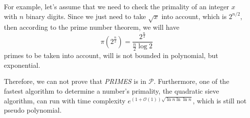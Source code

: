 \documentclass[12pt, a4paper]{article}
\begin{document}
For example, let's assume that we need to check the primality of an integer $x$ with $n$ binary digits. 
Since we just need to take $\sqrt{x}$ into account, which is $2^{n/2}$, then according to the prime number theorem, we will have
$$\pi(2^{\frac{n}{2}}) = \frac{2^{\frac{n}{2}}}{\frac{n}{2} \log 2}$$
primes to be taken into account, will is not bounded in polynomial, but exponential.

Therefore, we can not prove that \textit{PRIMES} is in $\mathcal{P}$. Furthermore, one of the fastest algorithm to determine a number's primality, 
the quadratic sieve algorithm, can run with time complexity $e^{(1 + \mathcal{O}(1))\sqrt{\ln n \ln \ln n}}$, which is still not pseudo polynomial.
\end{document}
